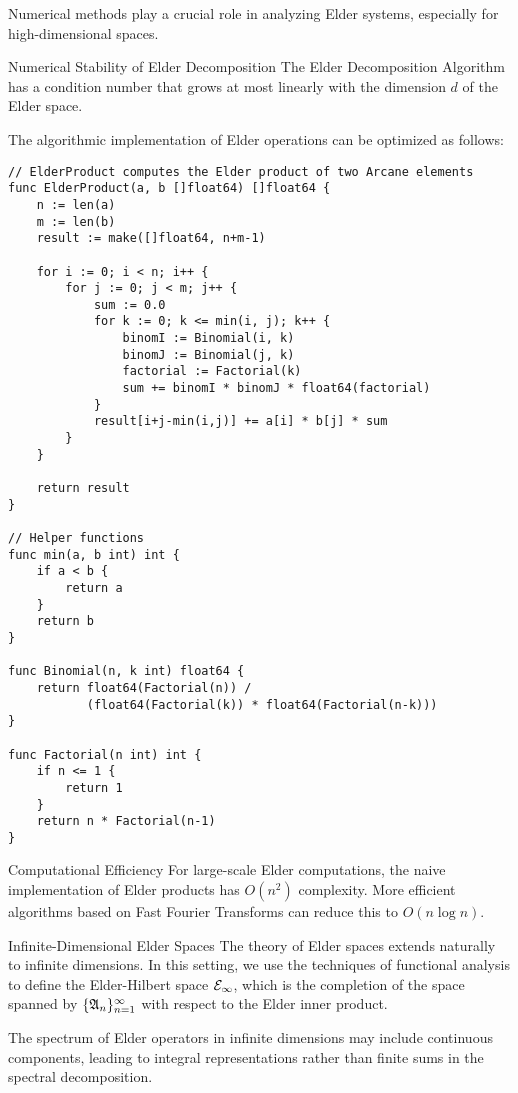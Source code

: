 \begin{twocolumnlayout}
Numerical methods play a crucial role in analyzing Elder systems, especially for high-dimensional spaces.

\begin{proposition}{Numerical Stability of Elder Decomposition}{}
The Elder Decomposition Algorithm has a condition number that grows at most linearly with the dimension $d$ of the Elder space.
\end{proposition}

The algorithmic implementation of Elder operations can be optimized as follows:

\begin{lstlisting}[caption={Implementation of Elder Product in GoLang}]
// ElderProduct computes the Elder product of two Arcane elements
func ElderProduct(a, b []float64) []float64 {
    n := len(a)
    m := len(b)
    result := make([]float64, n+m-1)
    
    for i := 0; i < n; i++ {
        for j := 0; j < m; j++ {
            sum := 0.0
            for k := 0; k <= min(i, j); k++ {
                binomI := Binomial(i, k)
                binomJ := Binomial(j, k)
                factorial := Factorial(k)
                sum += binomI * binomJ * float64(factorial)
            }
            result[i+j-min(i,j)] += a[i] * b[j] * sum
        }
    }
    
    return result
}

// Helper functions
func min(a, b int) int {
    if a < b {
        return a
    }
    return b
}

func Binomial(n, k int) float64 {
    return float64(Factorial(n)) / 
           (float64(Factorial(k)) * float64(Factorial(n-k)))
}

func Factorial(n int) int {
    if n <= 1 {
        return 1
    }
    return n * Factorial(n-1)
}
\end{lstlisting}

\begin{note}{Computational Efficiency}{}
For large-scale Elder computations, the naive implementation of Elder products has $O(n^2)$ complexity. More efficient algorithms based on Fast Fourier Transforms can reduce this to $O(n \log n)$.
\end{note}
\end{twocolumnlayout}

\begin{advancedtopic}{Infinite-Dimensional Elder Spaces}
The theory of Elder spaces extends naturally to infinite dimensions. In this setting, we use the techniques of functional analysis to define the Elder-Hilbert space $\mathcal{E}_{\infty}$, which is the completion of the space spanned by $\{\mathfrak{A}_{n}\}_{n=1}^{\infty}$ with respect to the Elder inner product.

The spectrum of Elder operators in infinite dimensions may include continuous components, leading to integral representations rather than finite sums in the spectral decomposition.
\end{advancedtopic}

